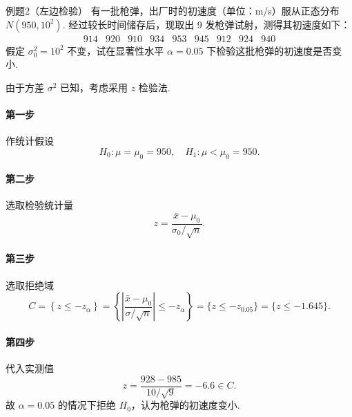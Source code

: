 \begin{question}{例题2（左边检验）}
    有一批枪弹，出厂时的初速度（单位：m/s）服从正态分布 $N(950, 10^2)$. 经过较长时间储存后，现取出 9 发枪弹试射，测得其初速度如下：
    $$
        \begin{array}{ccccccccc}
            914 & 920 & 910 & 934 & 953 & 945 & 912 & 924 & 940
        \end{array}
    $$
    假定 $\sigma_0^2=10^2$ 不变，试在显著性水平 $\alpha=0.05$ 下检验这批枪弹的初速度是否变小.
\end{question}
\begin{solution}
    由于方差 $\sigma^2$ 已知，考虑采用 $z$ 检验法.
    \paragraph{第一步} 作统计假设
    $$
        H_0: \mu=\mu_0=950, \quad H_1: \mu<\mu_0=950.
    $$
    \paragraph{第二步} 选取检验统计量
    $$
        z = \frac{\bar{x}-\mu_0}{\sigma_0/\sqrt{n}} .
    $$
    \paragraph{第三步} 选取拒绝域
    $$
        C = \left\{z \leqslant -z_{\alpha}\right\}
        = \left\{\left|\frac{\bar{x}-\mu_0}{\sigma/\sqrt{n}}\right| \leqslant -z_{\alpha}\right\}
        = \{z \leqslant -z_{0.05}\}
        = \{z \leqslant -1.645\}.
    $$
    \paragraph{第四步} 代入实测值
    $$
        z = \frac{928-985}{10/\sqrt{9}} = -6.6 \in C.
    $$
    故 $\alpha = 0.05$ 的情况下拒绝 $H_0$，认为枪弹的初速度变小.
\end{solution}



